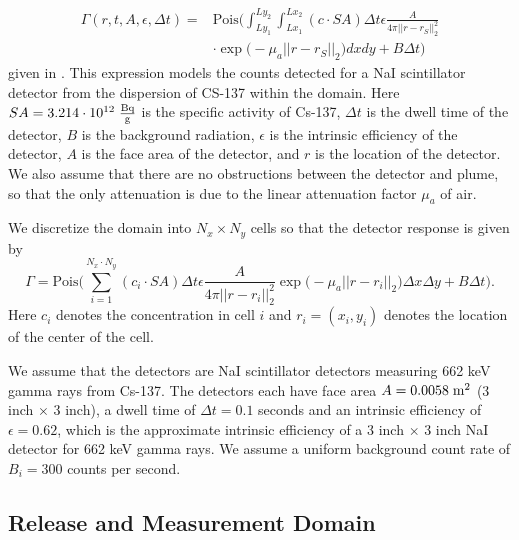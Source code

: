 \documentclass[sn-mathphys-ay]{sn-jnl}
\begin{document}
\begin{equation}
\begin{split}
\label{eq:sensor_int}
\Gamma(r,t, A,\epsilon, \Delta t)=&\text{Pois}\bigg( \int_{Ly_1}^{Ly_2}  \int_{Lx_1}^{Lx_2}(c \cdot SA) \Delta t \epsilon \frac{A}{4\pi ||r-r_S||_2^2} \\
&\cdot \exp\Big(-\mu_a ||r-r_S||_2\Big) dx dy +B\Delta t \bigg)
\end{split}
\end{equation}
given in \citep{RISO}. This expression models the counts detected for a NaI scintillator detector from the dispersion of CS-137 within the domain. Here $SA=3.214 \cdot 10^{12}  \hspace{1mm} \frac{\text{Bq}}{\text{g}}$ is the specific activity of Cs-137, $\Delta t$ is the dwell time of the detector, $B$ is the background radiation, $\epsilon$ is the intrinsic efficiency of the detector, $A$ is the face area of the detector, and $r$ is the location of the detector. We also assume that there are no obstructions between the detector and plume, so that the only attenuation is due to the linear attenuation factor $\mu_a$ of air.

We discretize the domain into $N_x \times N_y$ cells so that the detector response is given by 
\begin{equation}
\label{eq:sensor_approx}
\Gamma=\text{Pois}\bigg(\sum_{i=1}^{N_x \cdot N_y} (c_i \cdot SA) \Delta t \epsilon \frac{A}{4\pi ||r-r_i||_2^2} \exp\Big(-\mu_a ||r-r_i||_2\Big) \Delta x \Delta y+B\Delta t \bigg).
\end{equation}
Here $c_i$ denotes the concentration in cell $i$ and $r_i=(x_i,y_i)$ denotes the location of the center of the cell.

We assume that the detectors are NaI scintillator detectors measuring 662 keV gamma rays from Cs-137. The detectors each have face area $A=0.0058\hspace{1mm} \text{m}^2$ (3 inch $\times$ 3 inch), a dwell time of $\Delta t=0.1$ seconds and an intrinsic efficiency of $\epsilon=0.62$, which is the approximate intrinsic efficiency of a 3 inch $\times$ 3 inch NaI detector for 662 keV gamma rays. We assume a uniform background count rate of $B_i=300$ counts per second.

\subsection{Release and Measurement Domain}
\label{sec:domain2}
\end{document}
